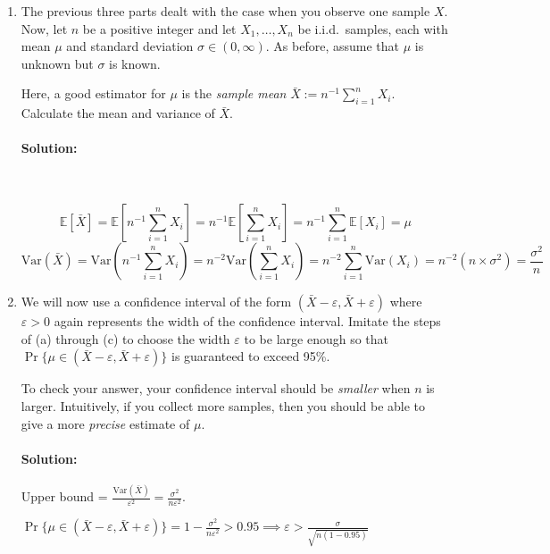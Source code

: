 \documentclass[11pt, notitlepage]{article}
\newcommand{\E}{\mathbb{E}}
\newcommand{\var}[1]{\text{Var}(#1)}
\newenvironment{solution}{\paragraph{Solution:}}{\hfill \vspace{10mm}}
\begin{document}
\begin{enumerate}[label=\alph*.)]
    \item The previous three parts dealt with the case when you observe one sample $X$. Now, let $n$ be a positive integer and let $X_1,\dotsc,X_n$ be i.i.d.\ samples, each with mean $\mu$ and standard deviation $\sigma \in (0, \infty)$. As before, assume that $\mu$ is unknown but $\sigma$ is known.

    Here, a good estimator for $\mu$ is the \emph{sample mean} $\bar X := n^{-1} \sum_{i=1}^n X_i$.
    Calculate the mean and variance of $\bar X$.
    \begin{solution}\
    	
    	$$\E[\bar{X}]=\E[n^{-1} \sum_{i=1}^n X_i]=n^{-1}\E[\sum_{i=1}^n X_i]=n^{-1}\sum_{i=1}^n\E[X_i]=\mu$$
    	$$\var{\bar{X}}=\var{n^{-1} \sum_{i=1}^n X_i}=n^{-2}\var{\sum_{i=1}^n X_i}=n^{-2}\sum_{i=1}^n\var{X_i}= n^{-2} (n\times \sigma^2)=\frac{\sigma^2}{n}$$
    \end{solution}
    \item We will now use a confidence interval of the form $(\bar X - \varepsilon, \bar X + \varepsilon)$ where $\varepsilon > 0$ again represents the width of the confidence interval. Imitate the steps of (a) through (c) to choose the width $\varepsilon$ to be large enough so that $\Pr\{\mu \in (\bar X-\varepsilon, \bar X + \varepsilon)\}$ is guaranteed to exceed 95\%.

    To check your answer, your confidence interval should be \emph{smaller} when $n$ is larger. Intuitively, if you collect more samples, then you should be able to give a more \emph{precise} estimate of $\mu$.
	\begin{solution}
		Upper bound = $\frac{\var{\bar{X}}}{\varepsilon^2}=\frac{\sigma^2}{n\varepsilon^2}$.
		
		$\Pr\{\mu \in (\bar X-\varepsilon, \bar X + \varepsilon)\}=1-\frac{\sigma^2}{n\varepsilon^2} > 0.95 \implies \varepsilon > \frac{\sigma}{\sqrt{n(1-0.95)}}$
	\end{solution}
\end{enumerate}
\end{document}
